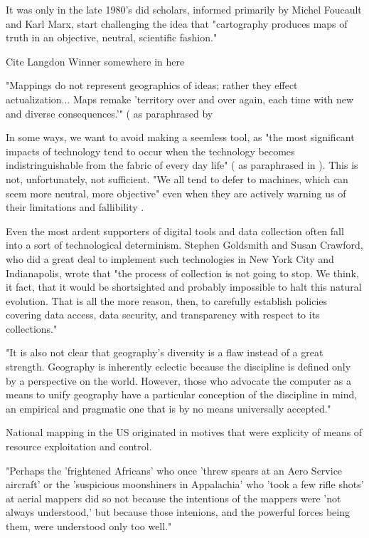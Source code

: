 It was only in the late 1980's did scholars, informed primarily by Michel Foucault and Karl Marx, start challenging the idea that "cartography produces maps of truth in an objective, neutral, scientific fashion." \cite{kitchinThinkingMaps2011}

Cite Langdon Winner somewhere in here

"Mappings do not represent geographics of ideas; rather they effect actualization... Maps remake 'territory over and over again, each time with new and diverse consequences.'" (\cite{cornerAgencyMappingSpeculation1999} as paraphrased by \cite{kitchinThinkingMaps2011}

In some ways, we want to avoid making a seemless tool, as "the most significant impacts of technology tend to occur when the technology becomes indistringuishable from the fabric of every day life" (\cite{weinerComputer21stCentury1991} as paraphrased in \cite{vereginComputerInnovationAdoption1994}). This is not, unfortunately, not sufficient. "We all tend to defer to machines, which can seem more neutral, more objective" even when they are actively warning us of their limitations and fallibility \cite{eubanksAutomatingInequalityHow2018}.

Even the most ardent supporters of digital tools and data collection often fall into a sort of technological determinism. Stephen Goldsmith and Susan Crawford, who did a great deal to implement such technologies in New York City and Indianapolis, wrote that "the process of collection is not going to stop. We think, it fact, that it would be shortsighted and probably impossible to halt this natural evolution. That is all the more reason, then, to carefully establish policies covering data access, data security, and transparency with respect to its collections." \cite{goldsmithResponsiveCityEngaging2014}

"It is also not clear that geography's diversity is a flaw instead of a great strength. Geography is inherently eclectic because the discipline is defined only by a perspective on the world. However, those who advocate the computer as a means to unify geography have a particular conception of the discipline in mind, an empirical and pragmatic one that is by no means universally accepted." \cite{vereginComputerInnovationAdoption1994}

National mapping in the US originated in motives that were explicity of means of resource exploitation and control. \cite{mchaffieManufacturingMetaphors1994}

"Perhaps the 'frightened Africans' who once 'threw spears at an Aero Service aircraft' or the 'suspicious moonshiners in Appalachia' who 'took a few rifle shots' at aerial mappers did so not because the intentions of the mappers were 'not always understood,' but because those intenions, and the powerful forces being them, were understood only too well." \cite{mchaffieManufacturingMetaphors1994}

